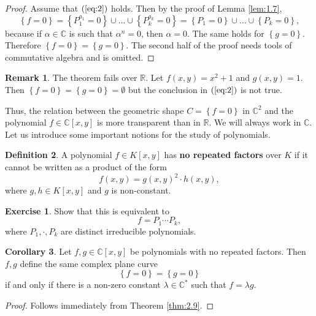 \documentclass{article}
\newcommand{\R}{\mathbb{R}}
\newcommand{\C}{\mathbb{C}}
\newcommand{\rb}[1]{\left( #1 \right)}
\renewcommand{\sb}[1]{\left[ #1 \right]}
\newcommand{\cb}[1]{\left\{ #1 \right\}}
\theoremstyle{definition}\newtheorem{definition}{Definition}[section]
\theoremstyle{definition}\newtheorem{notation}[definition]{Notation}
\theoremstyle{definition}\newtheorem{remark}[definition]{Remark}
\theoremstyle{definition}\newtheorem{example}[definition]{Example}
\theoremstyle{definition}\newtheorem{fact}{Fact}
\theoremstyle{definition}\newtheorem{exercise}{Exercise}
\newtheorem{corollary}[definition]{Corollary}
\begin{document}

\begin{proof}
Assume that $ \rb{\ref{eq:2}} $ holds. Then by the proof of Lemma \ref{lem:1.7},
$$ \cb{f = 0} = \cb{P_1^{a_1} = 0} \cup \dots \cup \cb{P_k^{a_k} = 0} = \cb{P_1 = 0} \cup \dots \cup \cb{P_k = 0}, $$
because if $ \alpha \in \C $ is such that $ \alpha^n = 0 $, then $ \alpha = 0 $. The same holds for $ \cb{g = 0} $. Therefore $ \cb{f = 0} = \cb{g = 0} $. The second half of the proof needs tools of commutative algebra and is omitted.
\end{proof}

\begin{remark}
The theorem fails over $ \R $. Let $ f\rb{x, y} = x^2 + 1 $ and $ g\rb{x, y} = 1 $. Then $ \cb{f = 0} = \cb{g = 0} = \emptyset $ but the conclusion in $ \rb{\ref{eq:2}} $ is not true.
\end{remark}

Thus, the relation between the geometric shape $ C = \cb{f = 0} $ in $ \C^2 $ and the polynomial $ f \in \C\sb{x, y} $ is more transparent than in $ \R $. We will always work in $ \C $. Let us introduce some important notions for the study of polynomials.

\begin{definition}
A polynomial $ f \in K\sb{x, y} $ has \textbf{no repeated factors} over $ K $ if it cannot be written as a product of the form
$$ f\rb{x, y} = g\rb{x, y}^2 \cdot h\rb{x, y}, $$
where $ g, h \in K\sb{x, y} $ and $ g $ is non-constant.
\end{definition}

\begin{exercise}
Show that this is equivalent to
$$ f = P_1 \cdots P_k, $$
where $ P_1, \cdot, P_k $ are distinct irreducible polynomials.
\end{exercise}

\begin{corollary}
Let $ f, g \in \C\sb{x, y} $ be polynomials with no repeated factors. Then $ f, g $ define the same complex plane curve
$$ \cb{f = 0} = \cb{g = 0} $$
if and only if there is a non-zero constant $ \lambda \in \C^* $ such that $ f = \lambda g $.
\end{corollary}

\begin{proof}
Follows immediately from Theorem \ref{thm:2.9}.
\end{proof}
\end{document}
